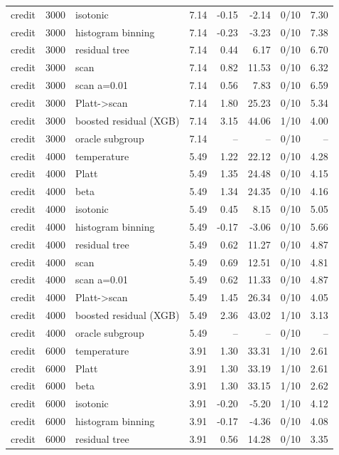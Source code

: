 \begin{tabular}{lllrrrlr}
credit & 3000 & isotonic & 7.14 & -0.15 & -2.14 & 0/10 & 7.30 \\
credit & 3000 & histogram binning & 7.14 & -0.23 & -3.23 & 0/10 & 7.38 \\
credit & 3000 & residual tree & 7.14 & 0.44 & 6.17 & 0/10 & 6.70 \\
credit & 3000 & scan & 7.14 & 0.82 & 11.53 & 0/10 & 6.32 \\
credit & 3000 & scan a=0.01 & 7.14 & 0.56 & 7.83 & 0/10 & 6.59 \\
credit & 3000 & Platt->scan & 7.14 & 1.80 & 25.23 & 0/10 & 5.34 \\
credit & 3000 & boosted residual (XGB) & 7.14 & 3.15 & 44.06 & 1/10 & 4.00 \\
credit & 3000 & oracle subgroup & 7.14 & -- & -- & 0/10 & -- \\
credit & 4000 & temperature & 5.49 & 1.22 & 22.12 & 0/10 & 4.28 \\
credit & 4000 & Platt & 5.49 & 1.35 & 24.48 & 0/10 & 4.15 \\
credit & 4000 & beta & 5.49 & 1.34 & 24.35 & 0/10 & 4.16 \\
credit & 4000 & isotonic & 5.49 & 0.45 & 8.15 & 0/10 & 5.05 \\
credit & 4000 & histogram binning & 5.49 & -0.17 & -3.06 & 0/10 & 5.66 \\
credit & 4000 & residual tree & 5.49 & 0.62 & 11.27 & 0/10 & 4.87 \\
credit & 4000 & scan & 5.49 & 0.69 & 12.51 & 0/10 & 4.81 \\
credit & 4000 & scan a=0.01 & 5.49 & 0.62 & 11.33 & 0/10 & 4.87 \\
credit & 4000 & Platt->scan & 5.49 & 1.45 & 26.34 & 0/10 & 4.05 \\
credit & 4000 & boosted residual (XGB) & 5.49 & 2.36 & 43.02 & 1/10 & 3.13 \\
credit & 4000 & oracle subgroup & 5.49 & -- & -- & 0/10 & -- \\
credit & 6000 & temperature & 3.91 & 1.30 & 33.31 & 1/10 & 2.61 \\
credit & 6000 & Platt & 3.91 & 1.30 & 33.19 & 1/10 & 2.61 \\
credit & 6000 & beta & 3.91 & 1.30 & 33.15 & 1/10 & 2.62 \\
credit & 6000 & isotonic & 3.91 & -0.20 & -5.20 & 1/10 & 4.12 \\
credit & 6000 & histogram binning & 3.91 & -0.17 & -4.36 & 0/10 & 4.08 \\
credit & 6000 & residual tree & 3.91 & 0.56 & 14.28 & 0/10 & 3.35 \\

\end{tabular}
